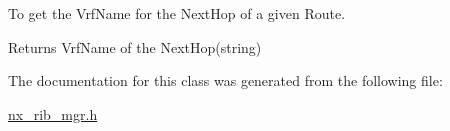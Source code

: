 To get the Vrf\+Name for the Next\+Hop of a given Route.

\begin{DoxyReturn}{Returns}
Vrf\+Name of the Next\+Hop(string)
\end{DoxyReturn}

 

The documentation for this class was generated from the following file\+:\begin{DoxyCompactItemize}
\item 
\mbox{\hyperlink{nx__rib__mgr_8h}{nx\+\_\+rib\+\_\+mgr.\+h}}\end{DoxyCompactItemize}
